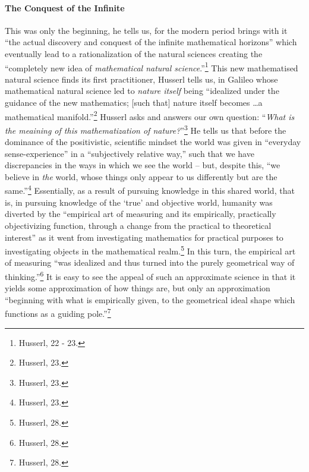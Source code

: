 \documentclass[12pt]{article}
\begin{document}
	\paragraph*{The Conquest of the Infinite} This was only the beginning, he tells us, for the modern period brings with it ``the actual discovery and conquest of the infinite mathematical horizons'' which eventually lead to a rationalization of the natural sciences creating the ``completely new idea of \emph{mathematical natural science}.''\footnote{Husserl, 22 - 23.} This new mathematised natural science finds its first practitioner, Husserl tells us, in Galileo whose mathematical natural science led to \emph{nature itself} being ``idealized under the guidance of the new mathematics; [such that] nature itself becomes \ldots a mathematical manifold.''\footnote{Husserl, 23.} Husserl asks and answers our own question: ``\emph{What is the meaining of this mathematization of nature?}''\footnote{Husserl, 23.} He tells us that before the dominance of the positivistic, scientific mindset the world was given in ``everyday sense-experience'' in a ``subjectively relative way,'' such that we have discrepancies in the ways in which we see the world -- but, despite this, ``we believe in \emph{the} world, whose things only appear to us differently but are the same.''\footnote{Husserl, 23.} Essentially, as a result of pursuing knowledge in this shared world, that is, in pursuing knowledge of the `true' and objective world, humanity was diverted by the ``empirical art of measuring and its empirically, practically objectivizing function, through a change from the practical to theoretical interest'' as it went from investigating mathematics for practical purposes to investigating objects in the mathematical realm.\footnote{Husserl, 28.} In this turn, the empirical art of measuring ``was idealized and thus turned into the purely geometrical way of thinking.''\footnote{Husserl, 28.} It is easy to see the appeal of such an approximate science in that it yields some approximation of how things are, but only an approximation ``beginning with what is empirically given, to the geometrical ideal shape which functions as a guiding pole.''\footnote{Husserl, 28.}
\end{document}
